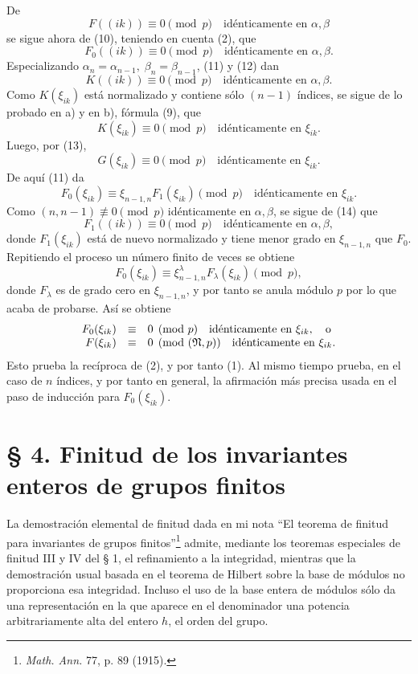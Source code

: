 \documentclass[11pt]{article}
\begin{document}
De
\[
        F((ik))\equiv0\pmod p\quad \text{idénticamente en \(\alpha,\beta\)}
\]
se sigue ahora de (10), teniendo en cuenta (2), que
\begin{equation}
        F_0((ik))\equiv0\pmod p\quad \text{idénticamente en \(\alpha,\beta\)}.
\end{equation}
Especializando \(\alpha_n=\alpha_{n-1},\;\beta_n=\beta_{n-1}\), (11) y (12) dan
\begin{equation}
        K((ik))\equiv0\pmod p\quad \text{idénticamente en \(\alpha,\beta\)}.
\end{equation}
Como \(K(\xi_{ik})\) está normalizado y contiene sólo \((n-1)\) índices, se sigue de lo probado en a) y en b), fórmula (9), que
\[
        K(\xi_{ik})\equiv0\pmod p\quad \text{idénticamente en \(\xi_{ik}\)}.
\]
Luego, por (13),
\[
        G(\xi_{ik})\equiv0\pmod p\quad \text{idénticamente en \(\xi_{ik}\)}.
\]
De aquí (11) da
\[
        F_0(\xi_{ik})\equiv \xi_{n-1,n}F_1(\xi_{ik})\pmod p
        \quad \text{idénticamente en \(\xi_{ik}\)}.
\]
Como \((n,n-1)\not\equiv0\pmod p\) idénticamente en \(\alpha,\beta\), se sigue de (14) que
\[
        F_1((ik))\equiv0\pmod p\quad \text{idénticamente en \(\alpha,\beta\)},
\]
donde \(F_1(\xi_{ik})\) está de nuevo normalizado y tiene menor grado en \(\xi_{n-1,n}\) que \(F_0\). Repitiendo el proceso un número finito de veces se obtiene
\[
        F_0(\xi_{ik})\equiv\xi_{n-1,n}^{\lambda}F_\lambda(\xi_{ik})\pmod p,
\]
donde \(F_\lambda\) es de grado cero en \(\xi_{n-1,n}\), y por tanto se anula módulo \(p\) por lo que acaba de probarse. Así se obtiene
\begin{equation}
\begin{array}{rcl}
        F_0(\xi_{ik})&\equiv&0\pmod p\quad \text{idénticamente en \(\xi_{ik}\)},\quad\text{o}\\
        F(\xi_{ik})&\equiv&0\pmod{(\mathfrak N,p)}\quad \text{idénticamente en \(\xi_{ik}\)}.
\end{array}
\end{equation}
Esto prueba la recíproca de (2), y por tanto (1). Al mismo tiempo prueba, en el caso de \(n\) índices, y por tanto en general, la afirmación más precisa usada en el paso de inducción para \(F_0(\xi_{ik})\).

\setcounter{equation}{0}
\section*{§ 4. Finitud de los invariantes enteros de grupos finitos}

La demostración elemental de finitud dada en mi nota ``El teorema de finitud para invariantes de grupos finitos''\footnote{\emph{Math. Ann.} 77, p. 89 (1915).} admite, mediante los teoremas especiales de finitud III y IV del § 1, el refinamiento a la integridad, mientras que la demostración usual basada en el teorema de Hilbert sobre la base de módulos no proporciona esa integridad. Incluso el uso de la base entera de módulos sólo da una representación en la que aparece en el denominador una potencia arbitrariamente alta del entero \(h\), el orden del grupo.
\end{document}
